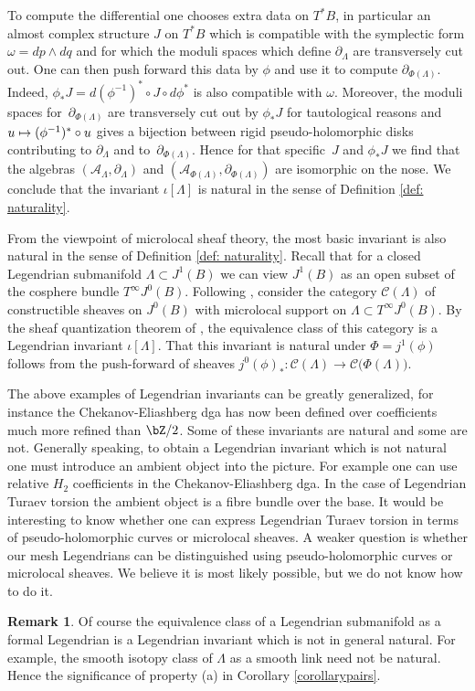 \documentclass[JEP,XML,SOM,Unicode,NoFloatCountersInSection]{cedram}
\let\mathcal\mathscr
\newcommand\mto{\mathchoice{\longmapsto}{\mapsto}{\mapsto}{\mapsto}}
\theoremstyle{plain}
\theoremstyle{definition}
\newtheorem{remark}[theorem]{Remark}
\newcommand{\cA}{\mathcal{A}}\newcommand{\cB}{\mathcal{B}}
\newcommand{\cC}{\mathcal{C}}\newcommand{\cD}{\mathcal{D}}
\begin{document}
To compute the differential one chooses extra data on $T^*B$, in particular an almost complex structure $J$ on $T^*B$ which is compatible with the symplectic form $\omega=dp \wedge dq$ and for which the moduli spaces which define $\partial_\Lambda$ are transversely cut out. One can then push forward this data by $\phi$ and use it to compute $\partial_{\Phi(\Lambda)}$. Indeed, $\phi_* J=d(\phi^{-1})^* \circ J \circ d \phi^*$ is also compatible with $\omega$. Moreover, the moduli spaces for~$\partial_{\Phi(\Lambda)}$ are transversely cut out by $\phi_*J$ for tautological reasons and $u \mto (\phi^{-1})^* \circ u$ gives a bijection between rigid pseudo-holomorphic disks contributing to $\partial_\Lambda$ and to~$\partial_{\Phi(\Lambda)}$. Hence for that specific~$J$ and $\phi_*J$ we find that the algebras $(\cA_\Lambda, \partial_\Lambda)$ and $(\cA_{\Phi(\Lambda)}, \partial_{\Phi(\Lambda)})$ are isomorphic on the nose. We conclude that the invariant $\iota[\Lambda]$ is natural in the sense of Definition \ref{def: naturality}.

From the viewpoint of microlocal sheaf theory, the most basic invariant is also natural in the sense of Definition \ref{def: naturality}. Recall that for a closed Legendrian submanifold $\Lambda \subset J^1(B)$ we can view $J^1(B)$ as an open subset of the cosphere bundle $T^\infty J^0(B)$. Following \cite{STZ17}, consider the category $\cC(\Lambda)$ of constructible sheaves on $J^0(B)$ with microlocal support on $\Lambda \subset T^\infty J^0(B)$. By the sheaf quantization theorem of \cite{GKS12}, the equivalence class of this category is a Legendrian invariant $\iota[\Lambda]$. That this invariant is natural under $\Phi=j^1(\phi)$ follows from the push-forward of sheaves $j^0(\phi)_*: \cC(\Lambda) \to \cC\big(\Phi(\Lambda)\big)$.

The above examples of Legendrian invariants can be greatly generalized, for instance the Chekanov-Eliashberg dga has now been defined over coefficients much more refined than $\bZ/2$. Some of these invariants are natural and some are not. Generally speaking, to obtain a Legendrian invariant which is not natural one must introduce an ambient object into the picture. For example one can use relative $H_2$ coefficients in the Chekanov-Eliashberg dga. In the case of Legendrian Turaev torsion the ambient object is a fibre bundle over the base. It would be interesting to know whether one can express Legendrian Turaev torsion in terms of pseudo-holomorphic curves or microlocal sheaves. A weaker question is whether our mesh Legendrians can be distinguished using pseudo-holomorphic curves or microlocal sheaves. We believe it is most likely possible, but we do not know how to do it.
\begin{remark}
Of course the equivalence class of a Legendrian submanifold as a formal Legendrian is a Legendrian invariant which is not in general natural. For example, the smooth isotopy class of $\Lambda$ as a smooth link need not be natural. Hence the significance of property (a) in Corollary \ref{corollarypairs}.
\end{remark}
\end{document}
